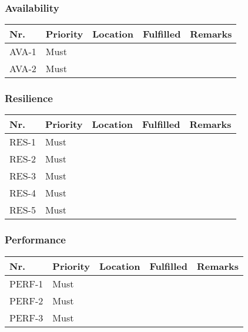 \subsubsection{Availability}
\begin{table}[H]
    \begin{tabular}{lllll}
    
        Nr.   & Priority & Location & Fulfilled & Remarks \\ \hline
        AVA-1 & Must     & ~        & ~         & ~       \\ 
        AVA-2 & Must     & ~        & ~         & ~       \\

    \end{tabular}
\end{table}

\subsubsection{Resilience}
\begin{table}[H]
    \begin{tabular}{lllll}
    
        Nr.   & Priority & Location & Fulfilled & Remarks \\ \hline
        RES-1 & Must     & ~        & ~         & ~       \\ 
        RES-2 & Must     & ~        & ~         & ~       \\ 
        RES-3 & Must     & ~        & ~         & ~       \\ 
        RES-4 & Must     & ~        & ~         & ~       \\ 
        RES-5 & Must     & ~        & ~         & ~       \\

    \end{tabular}
\end{table}

\subsubsection{Performance}
\begin{table}[H]
    \begin{tabular}{lllll}
    
        Nr.    & Priority & Location & Fulfilled & Remarks \\ \hline
        PERF-1 & Must     & ~        & ~         & ~       \\ 
        PERF-2 & Must     & ~        & ~         & ~       \\ 
        PERF-3 & Must     & ~        & ~         & ~       \\

    \end{tabular}
\end{table}

